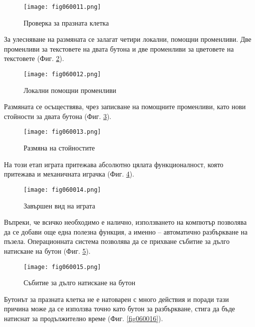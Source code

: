 \begin{figure}[H]
  \centering
  \texttt{[image: fig060011.png]}
  \caption{Проверка за празната клетка}
\label{fig060011}
\end{figure}

За улесняване на размяната се залагат четири локални, помощни променливи. Две променливи за текстовете на двата бутона и две променливи за цветовете на текстовете (Фиг. \ref{fig060012}).

\begin{figure}[H]
  \centering
  \texttt{[image: fig060012.png]}
  \caption{Локални помощни променливи}
\label{fig060012}
\end{figure}

Размяната се осъществява, чрез записване на помощните променливи, като нови стойности за двата бутона (Фиг. \ref{fig060013}).

\begin{figure}[H]
  \centering
  \texttt{[image: fig060013.png]}
  \caption{Размяна на стойностите}
\label{fig060013}
\end{figure}

На този етап играта притежава абсолютно цялата функционалност, която притежава и механичната играчка (Фиг. \ref{fig060014}).

\begin{figure}[H]
  \centering
  \texttt{[image: fig060014.png]}
  \caption{Завършен вид на играта}
\label{fig060014}
\end{figure}

Въпреки, че всичко необходимо е налично, използването на компютър позволява да се добави още една полезна функция, а именно – автоматично разбъркване на пъзела. Операционната система позволява да се прихване събитие за дълго натискане на бутон (Фиг. \ref{fig060015}).

\begin{figure}[H]
  \centering
  \texttt{[image: fig060015.png]}
  \caption{Събитие за дълго натискане на бутон}
\label{fig060015}
\end{figure}

Бутонът за празната клетка не е натоварен с много действия и поради тази причина може да се използва точно като бутон за разбъркване, стига да бъде натиснат за продължително време (Фиг. \ref{fig060016}).

